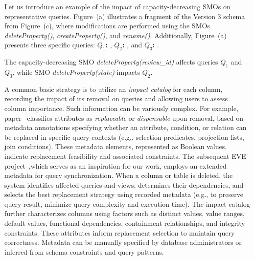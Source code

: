 \begin{example}
Let us introduce an example of the impact of capacity-decreasing SMOs on representative queries. Figure~(a) illustrates a fragment of the Version 3 schema from Figure~(c), where modifications are performed using the SMOs \emph{deleteProperty()}, \emph{createProperty()}, and \emph{rename()}. Additionally, Figure~(a) presents three specific queries: \textbf{$Q_1$:} , \textbf{$Q_2$:} , and \textbf{$Q_3$:} .

The capacity-decreasing SMO \emph{deleteProperty(review\_id)} affects queries $Q_1$ and $Q_3$, while SMO \emph{deleteProperty(state)} impacts $Q_2$.
\end{example}

A common basic strategy is to utilize an \textit{impact catalog} for each column, recording the impact of its removal on queries and allowing users to assess column importance. Such information can be variously complex. For example, paper~\citep{DBLP:conf/krdb/RundensteinerLN97} classifies attributes as \textit{replaceable} or \textit{dispensable} upon removal, based on metadata annotations specifying whether an attribute, condition, or relation can be replaced in specific query contexts (e.g., selection predicates, projection lists, join conditions). These metadata elements, represented as Boolean values, indicate replacement feasibility and associated constraints. The subsequent EVE project~\citep{DBLP:conf/sigmod/RundensteinerKZWLLN99},which serves as an inspiration for our work, employs an extended metadata for query synchronization. When a column or table is deleted, the system identifies affected queries and views, determines their dependencies, and selects the best replacement strategy using recorded metadata (e.g., to preserve query result, minimize query complexity and execution time). The impact catalog further characterizes columns using factors such as distinct values, value ranges, default values, functional dependencies, containment relationships, and integrity constraints. These attributes inform replacement selection to maintain query correctness. Metadata can be manually specified by database administrators or inferred from schema constraints and query patterns.

